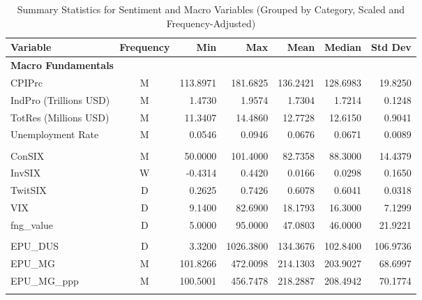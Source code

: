 \begin{table}[ht]
\centering
\scriptsize
\setlength{\tabcolsep}{4pt}
\begin{tabular}{lcrrrrr}
\toprule
Variable & Frequency & Min & Max & Mean & Median & Std Dev \\
\midrule
\multicolumn{7}{l}{\textbf{Macro Fundamentals}} \\
CPIPrc & M & 113.8971 & 181.6825 & 136.2421 & 128.6983 & 19.8250 \\
IndPro (Trillions USD) & M & 1.4730 & 1.9574 & 1.7304 & 1.7214 & 0.1248 \\
TotRes (Millions USD) & M & 11.3407 & 14.4860 & 12.7728 & 12.6150 & 0.9041 \\
Unemployment Rate & M & 0.0546 & 0.0946 & 0.0676 & 0.0671 & 0.0089 \\
\addlinespace
\multicolumn{7}{l}{\textbf{Sentiment}} \\
ConSIX & M & 50.0000 & 101.4000 & 82.7358 & 88.3000 & 14.4379 \\
InvSIX & W & -0.4314 & 0.4420 & 0.0166 & 0.0298 & 0.1650 \\
TwitSIX & D & 0.2625 & 0.7426 & 0.6078 & 0.6041 & 0.0318 \\
VIX & D & 9.1400 & 82.6900 & 18.1793 & 16.3000 & 7.1299 \\
fng\_value & D & 5.0000 & 95.0000 & 47.0803 & 46.0000 & 21.9221 \\
\addlinespace
\multicolumn{7}{l}{\textbf{Uncertainty}} \\
EPU\_DUS & D & 3.3200 & 1026.3800 & 134.3676 & 102.8400 & 106.9736 \\
EPU\_MG & M & 101.8266 & 472.0098 & 214.1303 & 203.9027 & 68.6997 \\
EPU\_MG\_ppp & M & 100.5001 & 456.7478 & 218.2887 & 208.4942 & 70.1774 \\
\addlinespace
\bottomrule
\end{tabular}
\caption{Summary Statistics for Sentiment and Macro Variables (Grouped by Category, Scaled and Frequency-Adjusted)}
\label{tab:macro_stat_summary}
\end{table}
